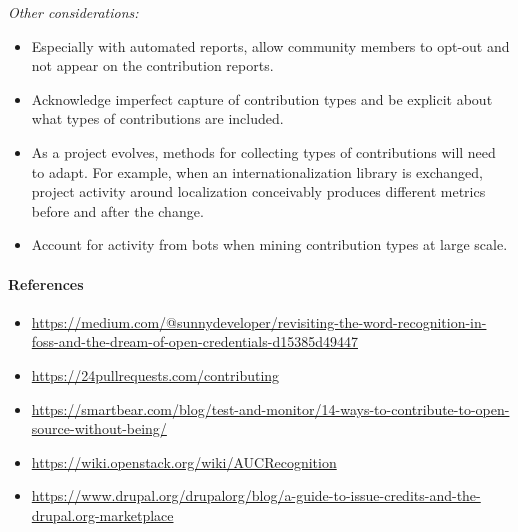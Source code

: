 \emph{Other considerations:}

\begin{itemize}
\tightlist
\item
  Especially with automated reports, allow community members to opt-out
  and not appear on the contribution reports.
\item
  Acknowledge imperfect capture of contribution types and be explicit
  about what types of contributions are included.
\item
  As a project evolves, methods for collecting types of contributions
  will need to adapt. For example, when an internationalization library
  is exchanged, project activity around localization conceivably
  produces different metrics before and after the change.
\item
  Account for activity from bots when mining contribution types at large
  scale.
\end{itemize}

\hypertarget{references}{%
\paragraph{References}\label{references}}

\begin{itemize}
\tightlist
\item
  \href{https://medium.com/@sunnydeveloper/revisiting-the-word-recognition-in-foss-and-the-dream-of-open-credentials-d15385d49447}{https://medium.com/@sunnydeveloper/revisiting-the-word-recognition-in-foss-and-the-dream-of-open-credentials-d15385d49447}
\item
  \href{https://24pullrequests.com/contributing}{https://24pullrequests.com/contributing}
\item
  \href{https://smartbear.com/blog/test-and-monitor/14-ways-to-contribute-to-open-source-without-being/}{https://smartbear.com/blog/test-and-monitor/14-ways-to-contribute-to-open-source-without-being/}
\item
  \href{https://wiki.openstack.org/wiki/AUCRecognition}{https://wiki.openstack.org/wiki/AUCRecognition}
\item
  \href{https://www.drupal.org/drupalorg/blog/a-guide-to-issue-credits-and-the-drupal.org-marketplace}{https://www.drupal.org/drupalorg/blog/a-guide-to-issue-credits-and-the-drupal.org-marketplace}
\end{itemize}
